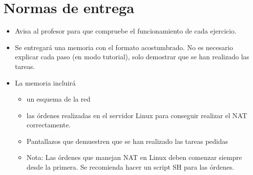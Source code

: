 \section{Normas de entrega}
\begin{itemize}
\item Avisa al profesor para que compruebe el funcionamiento de cada ejercicio. 
\item Se entregará una memoria con el formato acostumbrado. No es necesario explicar cada paso (en modo tutorial), solo demostrar que se han realizado las tareas.
\item La memoria incluirá

  \begin{itemize}
  \item un esquema de la red
  \item las órdenes realizadas en el servidor Linux para conseguir realizar el NAT correctamente.
  \item Pantallazos que demuestren que se han realizado las tareas pedidas
  \item
    \begin{small}
Nota: Las órdenes que manejan NAT en Linux deben comenzar siempre desde la primera. Se recomienda hacer un script SH para las órdenes.
\end{small}

  \end{itemize}

\end{itemize}

